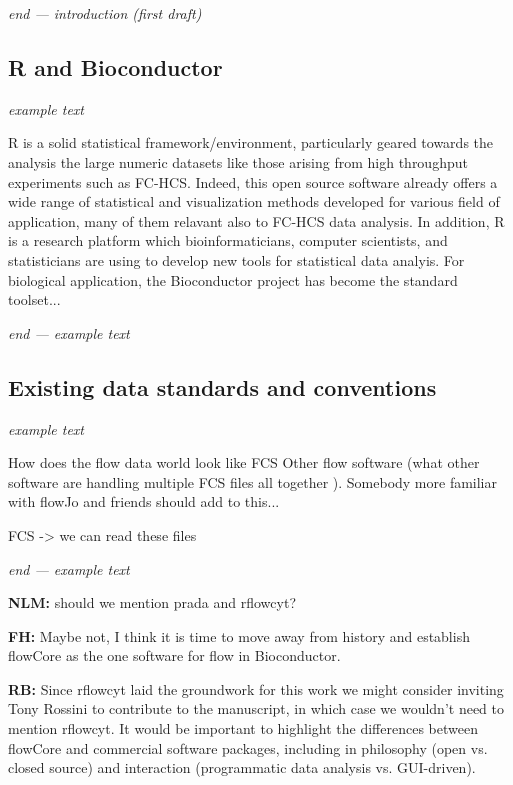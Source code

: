 \documentclass[12pt]{article}
\begin{document}
\textit{end --- introduction (first draft)}

\subsection{R and Bioconductor}

\textit{ example text}

R is a solid statistical framework/environment, particularly geared
towards the analysis the large numeric datasets like those arising
from high throughput experiments such as FC-HCS. Indeed, this open
source software already offers a wide range of statistical and
visualization methods developed for various field of application, many
of them relavant also to FC-HCS data analysis. In addition, R is a
research platform which bioinformaticians, computer scientists, and
statisticians are using to develop new tools for statistical data
analyis. For biological application, the Bioconductor project has
become the standard toolset...
 
\textit{end --- example text}

\subsection{Existing data standards and conventions}

\textit{ example text}

How does the flow data world look like FCS Other flow software (what
other software are handling multiple FCS files all together
). Somebody more familiar with flowJo and friends should add to
this...

FCS -> we can read these files

\textit{end --- example text}


{\bf NLM:} should we mention prada and rflowcyt?  

{\bf FH:} Maybe not, I think it is time to move away from history and
establish flowCore as the one software for flow in Bioconductor.

{\bf RB:} Since rflowcyt laid the groundwork for this work we might consider
inviting Tony Rossini to contribute to the manuscript, in which case we
wouldn't need to mention rflowcyt. It would be important to highlight
the differences between flowCore and commercial software packages,
including in philosophy (open vs. closed source) and interaction
(programmatic data analysis vs. GUI-driven). 
\end{document}

